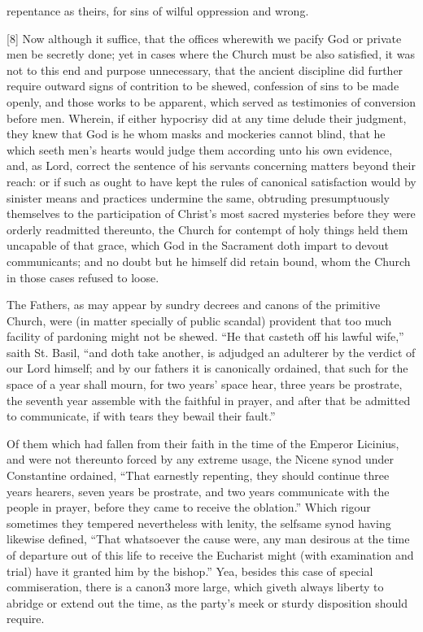 repentance as theirs, for sins of wilful oppression and wrong.


[8] Now although it suffice, that the offices wherewith we pacify God or private men be secretly done; yet in cases where the Church must be also satisfied, it was not to this end and purpose unnecessary, that the ancient discipline did further require outward signs of contrition to be shewed, confession of sins to be made openly, and those works to be apparent, which served as testimonies of conversion before men. Wherein, if either hypocrisy did at any time delude their judgment, they knew that God is he whom masks and mockeries cannot blind, that he which seeth men’s hearts would judge them according unto his own evidence, and, as Lord, correct the sentence of his servants concerning matters beyond their reach: or if such as ought to have kept the rules of canonical satisfaction would by sinister means and practices undermine the same, obtruding presumptuously themselves to the participation of Christ’s most sacred mysteries before they were orderly readmitted thereunto, the Church for contempt of holy things held them uncapable of that grace, which God in the Sacrament doth impart to devout communicants; and no doubt but he himself did retain bound, whom the Church in those cases refused to loose.

The Fathers, as may appear by sundry decrees and canons of the primitive Church, were (in matter specially of public scandal) provident that too much facility of pardoning might not be shewed. “He that casteth off his lawful wife,” saith St. Basil, “and doth take another, is adjudged an adulterer by the verdict of our Lord himself; and by our fathers it is canonically ordained, that such for the space of a year shall mourn, for two years’ space hear, three years be prostrate,  the seventh year assemble with the faithful in prayer, and after that be admitted to communicate, if with tears they bewail their fault.”

Of them which had fallen from their faith in the time of the Emperor Licinius, and were not thereunto forced by any extreme usage, the Nicene synod under Constantine ordained, “That earnestly repenting, they should continue three years hearers, seven years be prostrate, and two years communicate with the people in prayer, before they came to receive the oblation.” Which rigour sometimes they tempered nevertheless with lenity, the selfsame synod having likewise defined, “That whatsoever the cause were, any man desirous at the time of departure out of this life to receive the Eucharist might (with examination and trial) have it granted him by the bishop.” Yea, besides this case of special commiseration, there is a canon3 more large, which giveth always liberty to abridge or extend out the time, as the party’s meek or sturdy disposition should require.

